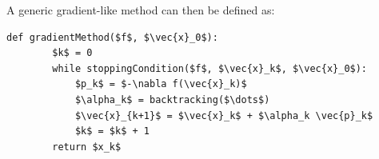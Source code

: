 A generic gradient-like method can then be defined as:
\begin{lstlisting}[mathescape=true]
    def gradientMethod($f$, $\vec{x}_0$):
        $k$ = 0
        while stoppingCondition($f$, $\vec{x}_k$, $\vec{x}_0$):
            $p_k$ = $-\nabla f(\vec{x}_k)$
            $\alpha_k$ = backtracking($\dots$)
            $\vec{x}_{k+1}$ = $\vec{x}_k$ + $\alpha_k \vec{p}_k$
            $k$ = $k$ + 1
        return $x_k$
\end{lstlisting}